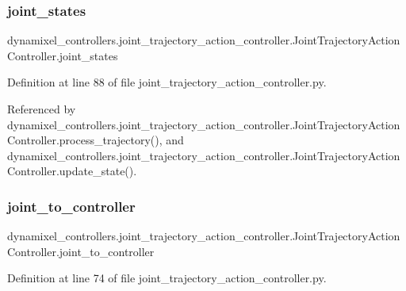 \subsubsection{\texorpdfstring{joint\+\_\+states}{joint\_states}}
{\footnotesize\ttfamily dynamixel\+\_\+controllers.\+joint\+\_\+trajectory\+\_\+action\+\_\+controller.\+Joint\+Trajectory\+Action\+Controller.\+joint\+\_\+states}



Definition at line 88 of file joint\+\_\+trajectory\+\_\+action\+\_\+controller.\+py.



Referenced by dynamixel\+\_\+controllers.\+joint\+\_\+trajectory\+\_\+action\+\_\+controller.\+Joint\+Trajectory\+Action\+Controller.\+process\+\_\+trajectory(), and dynamixel\+\_\+controllers.\+joint\+\_\+trajectory\+\_\+action\+\_\+controller.\+Joint\+Trajectory\+Action\+Controller.\+update\+\_\+state().

\mbox{\label{classdynamixel__controllers_1_1joint__trajectory__action__controller_1_1_joint_trajectory_action_controller_a0fd9fa565c826ab2191a34b649030916}} 
\subsubsection{\texorpdfstring{joint\+\_\+to\+\_\+controller}{joint\_to\_controller}}
{\footnotesize\ttfamily dynamixel\+\_\+controllers.\+joint\+\_\+trajectory\+\_\+action\+\_\+controller.\+Joint\+Trajectory\+Action\+Controller.\+joint\+\_\+to\+\_\+controller}



Definition at line 74 of file joint\+\_\+trajectory\+\_\+action\+\_\+controller.\+py.



